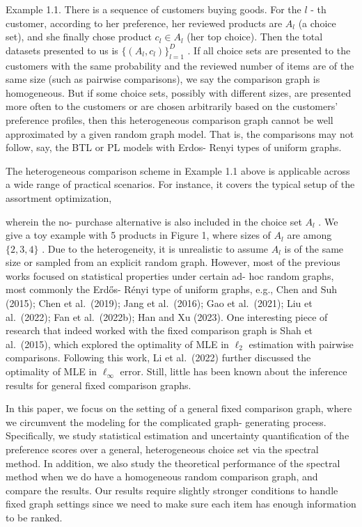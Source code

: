 Example 1.1. There is a sequence of customers buying goods. For the
\(l\) - th customer, according to her preference, her reviewed products
are \(A_{l}\) (a choice set), and she finally chose product
\(c_{l}\in A_{l}\) (her top choice). Then the total datasets presented
to us is \(\{(A_l,c_l)\}_{l = 1}^D\) . If all choice sets are presented
to the customers with the same probability and the reviewed number of
items are of the same size (such as pairwise comparisons), we say the
comparison graph is homogeneous. But if some choice sets, possibly with
different sizes, are presented more often to the customers or are chosen
arbitrarily based on the customers' preference profiles, then this
heterogeneous comparison graph cannot be well approximated by a given
random graph model. That is, the comparisons may not follow, say, the
BTL or PL models with Erdos- Renyi types of uniform graphs.

The heterogeneous comparison scheme in Example 1.1 above is applicable
across a wide range of practical scenarios. For instance, it covers the
typical setup of the assortment optimization,


wherein the no- purchase alternative is also included in the choice set
\(A_{l}\) . We give a toy example with 5 products in Figure 1, where
sizes of \(A_{l}\) are among \(\{2,3,4\}\) . Due to the heterogeneity,
it is unrealistic to assume \(A_{l}\) is of the same size or sampled
from an explicit random graph. However, most of the previous works
focused on statistical properties under certain ad- hoc random graphs,
most commonly the Erdős- Rényi type of uniform graphs, e.g., Chen and
Suh (2015); Chen et al.~(2019); Jang et al.~(2016); Gao et al.~(2021);
Liu et al.~(2022); Fan et al.~(2022b); Han and Xu (2023). One
interesting piece of research that indeed worked with the fixed
comparison graph is Shah et al.~(2015), which explored the optimality of
MLE in \(\ell_{2}\) estimation with pairwise comparisons. Following this
work, Li et al.~(2022) further discussed the optimality of MLE in
\(\ell_{\infty}\) error. Still, little has been known about the
inference results for general fixed comparison graphs.

In this paper, we focus on the setting of a general fixed comparison
graph, where we circumvent the modeling for the complicated graph-
generating process. Specifically, we study statistical estimation and
uncertainty quantification of the preference scores over a general,
heterogeneous choice set via the spectral method. In addition, we also
study the theoretical performance of the spectral method when we do have
a homogeneous random comparison graph, and compare the results. Our
results require slightly stronger conditions to handle fixed graph
settings since we need to make sure each item has enough information to
be ranked.

